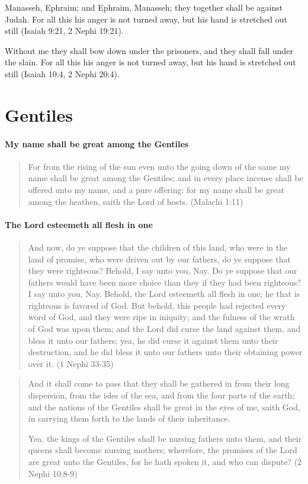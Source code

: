 Manasseh, Ephraim; and Ephraim, Manasseh; they together shall be against Judah. For all this his anger is not turned away, but his hand is stretched out still (Isaiah 9:21, 2 Nephi 19:21).

Without me they shall bow down under the prisoners, and they shall fall under the slain. For all this his anger is not turned away, but his hand is stretched out still (Isaiah 10:4, 2 Nephi 20:4).

\section{Gentiles}

\paragraph{My name shall be great among the Gentiles}
\begin{quotation}
For from the rising of the sun even unto the going down of the same my name shall be great among the Gentiles; and in every place incense shall be offered unto my name, and a pure offering: for my name shall be great among the heathen, saith the Lord of hosts. (Malachi 1:11)
\end{quotation}

\paragraph{The Lord esteemeth all flesh in one}
\begin{quotation}
And now, do ye suppose that the children of this land, who were in the land of promise, who were driven out by our fathers, do ye suppose that they were righteous? Behold, I say unto you, Nay. Do ye suppose that our fathers would have been more choice than they if they had been righteous? I say unto you, Nay. Behold, the Lord esteemeth all flesh in one; he that is righteous is favored of God. But behold, this people had rejected every word of God, and they were ripe in iniquity; and the fulness of the wrath of God was upon them; and the Lord did curse the land against them, and bless it unto our fathers; yea, he did curse it against them unto their destruction, and he did bless it unto our fathers unto their obtaining power over it. (1 Nephi 33-35)
\end{quotation}

\begin{quotation}
And it shall come to pass that they shall be gathered in from their long dispersion, from the isles of the sea, and from the four parts of the earth; and the nations of the Gentiles shall be great in the eyes of me, saith God, in carrying them forth to the lands of their inheritance.

Yea, the kings of the Gentiles shall be nursing fathers unto them, and their queens shall become nursing mothers; wherefore, the promises of the Lord are great unto the Gentiles, for he hath spoken it, and who can dispute? (2 Nephi 10:8-9)
\end{quotation}

